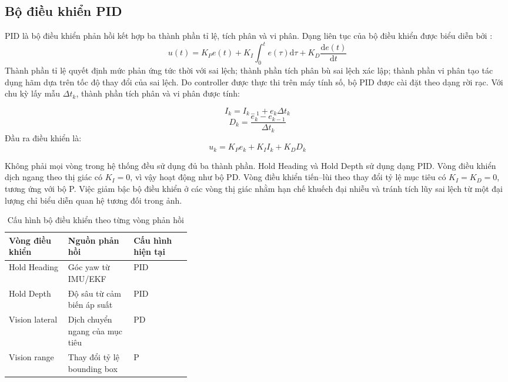 \documentclass[../DoAn.tex]{subfiles}
\begin{document}
\subsection{Bộ điều khiển PID}

PID là bộ điều khiển phản hồi kết hợp ba thành phần tỉ lệ, tích phân và vi phân. Dạng liên tục của bộ điều khiển được biểu diễn bởi \cite{astrom_hagglund1995}:
\[
u(t) = K_P e(t) + K_I \int_{0}^{t} e(\tau)\mathrm{d}\tau + K_D \frac{\mathrm{d}e(t)}{\mathrm{d}t}
\]
Thành phần tỉ lệ quyết định mức phản ứng tức thời với sai lệch; thành phần tích phân bù sai lệch xác lập; thành phần vi phân tạo tác dụng hãm dựa trên tốc độ thay đổi của sai lệch. Do controller được thực thi trên máy tính số, bộ PID được cài đặt theo dạng rời rạc. Với chu kỳ lấy mẫu $\Delta t_k$, thành phần tích phân và vi phân được tính:

\[
I_k = I_{k-1} + e_k \Delta t_k
\]
\[
D_k = \frac{e_k - e_{k-1}}{\Delta t_k}
\]
Đầu ra điều khiển là:
\[
u_k = K_P e_k + K_I I_k + K_D D_k
\]

Không phải mọi vòng trong hệ thống đều sử dụng đủ ba thành phần. Hold Heading và Hold Depth sử dụng dạng PID. Vòng điều khiển dịch ngang theo thị giác có $K_I = 0$, vì vậy hoạt động như bộ PD. Vòng điều khiển tiến--lùi theo thay đổi tỷ lệ mục tiêu có $K_I = K_D = 0$, tương ứng với bộ P. Việc giảm bậc bộ điều khiển ở các vòng thị giác nhằm hạn chế khuếch đại nhiễu và tránh tích lũy sai lệch từ một đại lượng chỉ biểu diễn quan hệ tương đối trong ảnh.

\begin{table}[htbp]
    \centering
    \caption{Cấu hình bộ điều khiển theo từng vòng phản hồi}
    \label{tab:cauhinh_pid_vong}
    \renewcommand{\arraystretch}{1.25}
    \begin{tabular}{|l|p{0.36\linewidth}|l|}
        \hline
        \textbf{Vòng điều khiển} & \textbf{Nguồn phản hồi} & \textbf{Cấu hình hiện tại} \\
        \hline
        Hold Heading & Góc yaw từ IMU/EKF & PID \\
        \hline
        Hold Depth & Độ sâu từ cảm biến áp suất & PID \\
        \hline
        Vision lateral & Dịch chuyển ngang của mục tiêu & PD \\
        \hline
        Vision range & Thay đổi tỷ lệ bounding box & P \\
        \hline
    \end{tabular}
\end{table}
\end{document}
